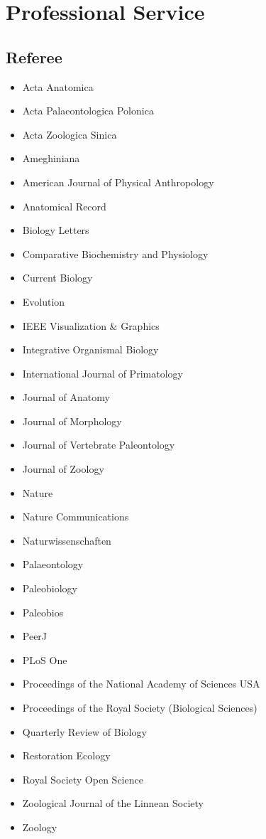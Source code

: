 \documentclass[11pt, a4paper]{awesome-cv}
\providecommand{\tightlist}{%
	\setlength{\itemsep}{0pt}\setlength{\parskip}{0pt}}
\begin{document}
\hypertarget{professional-service}{%
\section{Professional Service}\label{professional-service}}

\hypertarget{referee}{%
\subsection{Referee}\label{referee}}

\begin{itemize}
\tightlist
\item
  Acta Anatomica
\item
  Acta Palaeontologica Polonica
\item
  Acta Zoologica Sinica
\item
  Ameghiniana
\item
  American Journal of Physical Anthropology
\item
  Anatomical Record
\item
  Biology Letters
\item
  Comparative Biochemistry and Physiology
\item
  Current Biology
\item
  Evolution
\item
  IEEE Visualization \& Graphics
\item
  Integrative Organismal Biology
\item
  International Journal of Primatology
\item
  Journal of Anatomy
\item
  Journal of Morphology
\item
  Journal of Vertebrate Paleontology
\item
  Journal of Zoology
\item
  Nature
\item
  Nature Communications
\item
  Naturwissenschaften
\item
  Palaeontology
\item
  Paleobiology
\item
  Paleobios
\item
  PeerJ
\item
  PLoS One
\item
  Proceedings of the National Academy of Sciences USA
\item
  Proceedings of the Royal Society (Biological Sciences)
\item
  Quarterly Review of Biology
\item
  Restoration Ecology
\item
  Royal Society Open Science
\item
  Zoological Journal of the Linnean Society
\item
  Zoology
\end{itemize}
\end{document}
